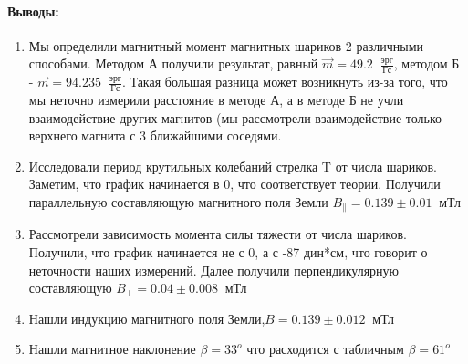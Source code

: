 \documentclass[a4paper,12pt]{article}
\begin{document}
\paragraph{Выводы:}
\begin{enumerate}
\item Мы определили магнитный момент магнитных шариков 2 различными способами. Методом А получили результат, равный $\overrightarrow{m}=49.2\;\;\frac{\text{эрг}}{\text{Гс}}$, методом Б - $\overrightarrow{m}=94.235\;\;\frac{\text{эрг}}{\text{Гс}}$. Такая большая разница может возникнуть из-за того, что мы неточно измерили расстояние в методе А, а в методе Б не учли взаимодействие других магнитов (мы рассмотрели взаимодействие только верхнего магнита с 3 ближайшими соседями.
\item Исследовали период крутильных колебаний стрелка T от числа шариков. Заметим, что график начинается в 0, что соответствует теории. Получили параллельную составляющую магнитного поля Земли $B_{\parallel}=0.139 \pm 0.01\;\;\text{мТл}$
\item Рассмотрели зависимость момента силы тяжести от числа шариков. Получили, что график начинается не с 0, а с -87 дин*см, что говорит о неточности наших измерений. Далее получили перпендикулярную составляющую $B_{\perp}=0.04 \pm 0.008\;\;\text{мТл}$
\item Нашли индукцию магнитного поля Земли,$B=0.139 \pm 0.012\;\;\text{мТл}$
\item Нашли магнитное наклонение $\beta = 33^o$ что расходится с табличным $\beta = 61^o$
\end{enumerate}
\end{document}

